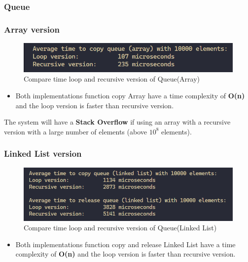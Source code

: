 \subsubsection{Queue}
\subsubsection*{Array version}
\begin{figure}[H]
    \centering
    \includegraphics[width=13cm]{img/img18.PNG}
    \caption{Compare time loop and recursive version of Queue(Array)}
    \label{fig:QueueArrayCompare}
\end{figure}
\begin{itemize}
    \item  Both implementations function copy Array have a time complexity of \textbf{O(n)} and the loop version is faster than recursive version.
\end{itemize}
The system will have a \textbf{Stack Overflow} if using an array with a recursive version with a large number of elements (above $10^{8}$ elements).
\subsubsection*{Linked List version}
\begin{figure}[H]
    \centering
    \includegraphics[width=13cm]{img/img19.PNG}
    \caption{Compare time loop and recursive version of Queue(Linked List)}
    \label{fig:QueueLinkedListCompare}
\end{figure}

\begin{itemize}
    \item  Both implementations function copy and release Linked List have a time complexity of \textbf{O(n)} and the loop version is faster than recursive version.
\end{itemize}



